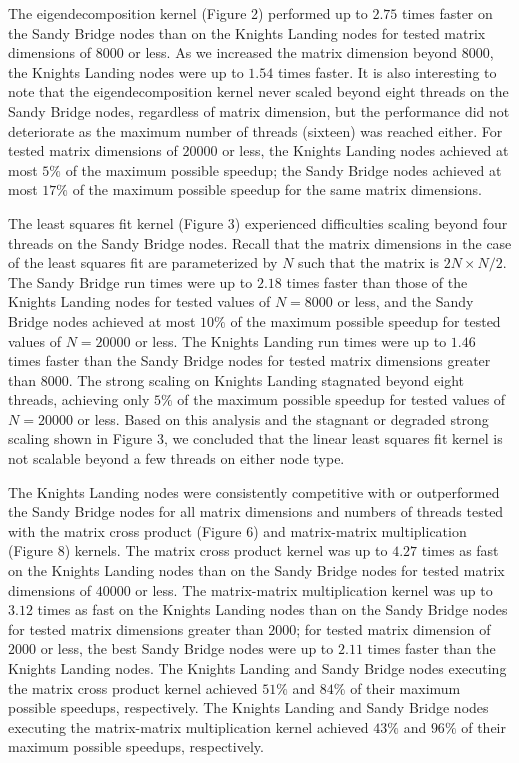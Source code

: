 The eigendecomposition kernel (Figure 2) performed up to $2.75$ times faster on
  the Sandy Bridge nodes than on the Knights Landing nodes for tested matrix
  dimensions of $8000$ or less.
As we increased the matrix dimension beyond $8000$, the Knights Landing nodes
  were up to $1.54$ times faster.
It is also interesting to note that the eigendecomposition kernel never scaled
  beyond eight threads on the Sandy Bridge nodes, regardless of matrix
  dimension, but the performance did not deteriorate as the maximum number of
  threads (sixteen) was reached either.
For tested matrix dimensions of $20000$ or less, the Knights Landing nodes
  achieved at most $5\%$ of the maximum possible speedup; the Sandy Bridge
  nodes achieved at most $17\%$ of the maximum possible speedup for the same
  matrix dimensions.

The least squares fit kernel (Figure 3) experienced difficulties scaling beyond
  four threads on the Sandy Bridge nodes.
Recall that the matrix dimensions in the case of the least squares fit are
  parameterized by $N$ such that the matrix is $2N \times N/2$.
The Sandy Bridge run times were up to $2.18$ times faster than those of the
  Knights Landing nodes for tested values of $N=8000$ or less, and the Sandy
  Bridge nodes achieved at most $10\%$ of the maximum possible speedup for
  tested values of $N=20000$ or less.
The Knights Landing run times were up to $1.46$ times faster than the Sandy
  Bridge nodes for tested matrix dimensions greater than $8000$.
The strong scaling on Knights Landing stagnated beyond eight threads, achieving
  only $5\%$ of the maximum possible speedup for tested values of $N=20000$ or
  less.
Based on this analysis and the stagnant or degraded strong scaling shown in
  Figure 3, we concluded that the linear least squares fit kernel is not
  scalable beyond a few threads on either node type.

The Knights Landing nodes were consistently competitive with or outperformed the
  Sandy Bridge nodes for all matrix dimensions and numbers of threads tested
  with the matrix cross product (Figure 6) and matrix-matrix multiplication
  (Figure 8) kernels.
The matrix cross product kernel was up to $4.27$ times as fast on the Knights
  Landing nodes than on the Sandy Bridge nodes for tested matrix dimensions of
  $40000$ or less.
The matrix-matrix multiplication kernel was up to $3.12$ times as fast on the
  Knights Landing nodes than on the Sandy Bridge nodes for tested matrix
  dimensions greater than $2000$; for tested matrix dimension of $2000$ or less,
  the best Sandy Bridge nodes were up to $2.11$ times faster than the Knights
  Landing nodes.
The Knights Landing and Sandy Bridge nodes executing the matrix cross product
  kernel achieved $51\%$ and $84\%$ of their maximum possible speedups,
  respectively.
The Knights Landing and Sandy Bridge nodes executing the matrix-matrix
  multiplication kernel achieved $43\%$ and $96\%$ of their maximum possible
  speedups, respectively. 

